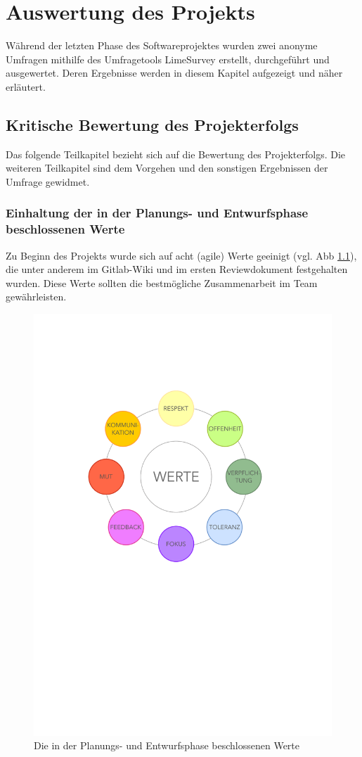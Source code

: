 \documentclass[../review_3.tex]{subfiles}
\begin{document}
\chapter{Auswertung des Projekts}\thispagestyle{fancy}
Während der letzten Phase des Softwareprojektes wurden zwei anonyme Umfragen mithilfe des Umfragetools LimeSurvey erstellt, durchgeführt und ausgewertet. Deren Ergebnisse werden in diesem Kapitel aufgezeigt und näher erläutert.
\section{Kritische Bewertung des Projekterfolgs}
Das folgende Teilkapitel bezieht sich auf die Bewertung des Projekterfolgs. Die weiteren Teilkapitel sind dem Vorgehen und den sonstigen Ergebnissen der Umfrage gewidmet.
%
%
\subsection{Einhaltung der in der Planungs- und Entwurfsphase beschlossenen Werte}
Zu Beginn des Projekts wurde sich auf acht (agile) Werte geeinigt (vgl. Abb \ref{werte}), die unter anderem im Gitlab-Wiki und im ersten Reviewdokument festgehalten wurden. Diese Werte sollten die bestmögliche Zusammenarbeit im Team gewährleisten.
\begin{figure} [t]
    \centering
    \includegraphics[width = 0.7\linewidth]{img/Werte.pdf}
    \caption{Die in der Planungs- und Entwurfsphase beschlossenen Werte}
    \label{werte}
\end{figure}
\end{document}
